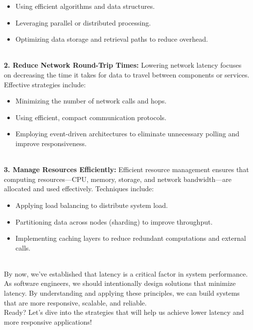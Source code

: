\begin{itemize}
\item
\protect{}\label{wnxcZ1EV7js_Xfgv_r7mf}
Using efficient algorithms and data structures.
\item
\protect{}\label{ZldOtKTlHPC-GzmY2wWQT}
Leveraging parallel or distributed processing.
\item
\protect{}\label{1sNTMAn9iFiqTa7KYVN-r}
Optimizing data storage and retrieval paths to reduce overhead.
\end{itemize}
\\
\textbf{2. Reduce Network Round-Trip Times:} Lowering network latency focuses on decreasing the time it takes for data to travel between components or services. Effective strategies include:

\begin{itemize}
\item
\protect{}\label{2NtvV6AD0tI-ToG0L0HEH}
Minimizing the number of network calls and hops.
\item
\protect{}\label{P4f3lr4_321qacU98fopi}
Using efficient, compact communication protocols.
\item
\protect{}\label{zdk10tfkTRiY69P9E1UI1}
Employing event-driven architectures to eliminate unnecessary polling and improve responsiveness.
\end{itemize}
\\
\textbf{3. Manage Resources Efficiently:} Efficient resource management ensures that computing resources---CPU, memory, storage, and network bandwidth---are allocated and used effectively. Techniques include:

\begin{itemize}
\item
\protect{}\label{vwQ0hGO2re4ny5-rjlH6K}
Applying load balancing to distribute system load.
\item
\protect{}\label{Y_olfnFSpAW-WQS8AmwIr}
Partitioning data across nodes (sharding) to improve throughput.
\item
\protect{}\label{Ann_xkbc5nQHZUAdr3zs8}
Implementing caching layers to reduce redundant computations and external calls.
\end{itemize}
\\
By now, we've established that latency is a critical factor in system performance. As software engineers, we should intentionally design solutions that minimize latency. By understanding and applying these principles, we can build systems that are more responsive, scalable, and reliable.
\\
Ready? Let's dive into the strategies that will help us achieve lower latency and more responsive applications!

